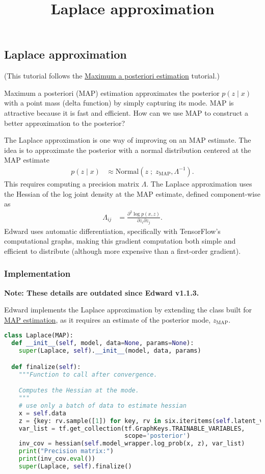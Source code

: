 \title{Laplace approximation}

\subsection{Laplace approximation}

(This tutorial follows the
\href{/tutorials/map}{Maximum a posteriori estimation} tutorial.)

Maximum a posteriori (MAP) estimation approximates the posterior $p(z \mid x)$
with a point mass (delta function) by simply capturing its mode. MAP is
attractive because it is fast and efficient. How can we use MAP to construct a
better approximation to the posterior?

The Laplace approximation
\citep{laplace1986memoir}
is one way of improving on an MAP estimate. The idea
is to approximate the posterior with a normal distribution centered at the MAP
estimate
\begin{align*}
  p(z \mid x)
  &\approx
  \text{Normal}(z\;;\; z_\text{MAP}, \Lambda^{-1}).
\end{align*}
This requires computing a precision matrix $\Lambda$. The Laplace approximation
uses the Hessian of the log joint density at the MAP estimate,
defined component-wise as
\begin{align*}
  \Lambda_{ij}
  &=
  \frac{\partial^2 \log p(x, z)}{\partial z_i \partial z_j}.
\end{align*}
Edward uses automatic differentiation, specifically with TensorFlow's
computational graphs, making this gradient computation both simple and
efficient to distribute (although more expensive than a first-order
gradient).

\subsubsection{Implementation}

\textbf{Note: These details are outdated since Edward v1.1.3.}

Edward implements the Laplace approximation by extending the class built for
\href{/tutorials/map}{MAP estimation}, as it requires an estimate of the
posterior mode, $z_\text{MAP}$.

\begin{lstlisting}[language=Python]
class Laplace(MAP):
  def __init__(self, model, data=None, params=None):
    super(Laplace, self).__init__(model, data, params)

  def finalize(self):
    """Function to call after convergence.

    Computes the Hessian at the mode.
    """
    # use only a batch of data to estimate hessian
    x = self.data
    z = {key: rv.sample([1]) for key, rv in six.iteritems(self.latent_vars)}
    var_list = tf.get_collection(tf.GraphKeys.TRAINABLE_VARIABLES,
                                 scope='posterior')
    inv_cov = hessian(self.model_wrapper.log_prob(x, z), var_list)
    print("Precision matrix:")
    print(inv_cov.eval())
    super(Laplace, self).finalize()
\end{lstlisting}

